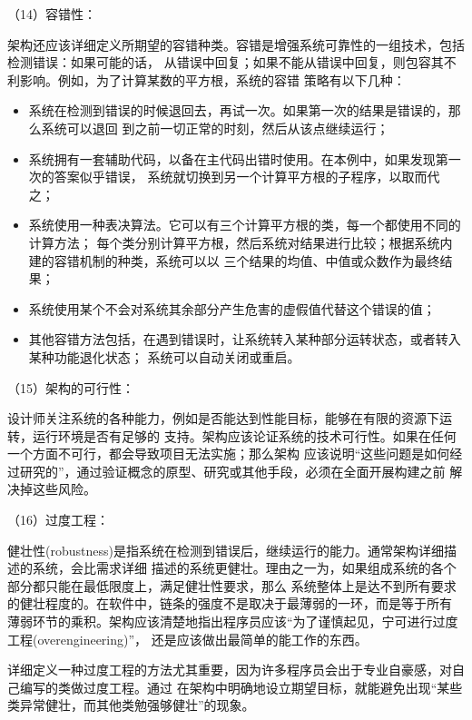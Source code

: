 \documentclass{article}
\begin{document}
\par
（14）容错性：
\par
架构还应该详细定义所期望的容错种类。容错是增强系统可靠性的一组技术，包括检测错误：如果可能的话，
从错误中回复；如果不能从错误中回复，则包容其不利影响。例如，为了计算某数的平方根，系统的容错
策略有以下几种：
\begin{itemize}
    \item 系统在检测到错误的时候退回去，再试一次。如果第一次的结果是错误的，那么系统可以退回
    到之前一切正常的时刻，然后从该点继续运行；
    \item 系统拥有一套辅助代码，以备在主代码出错时使用。在本例中，如果发现第一次的答案似乎错误，
    系统就切换到另一个计算平方根的子程序，以取而代之；
    \item 系统使用一种表决算法。它可以有三个计算平方根的类，每一个都使用不同的计算方法；
    每个类分别计算平方根，然后系统对结果进行比较；根据系统内建的容错机制的种类，系统可以以
    三个结果的均值、中值或众数作为最终结果；
    \item 系统使用某个不会对系统其余部分产生危害的虚假值代替这个错误的值；
    \item 其他容错方法包括，在遇到错误时，让系统转入某种部分运转状态，或者转入某种功能退化状态；
    系统可以自动关闭或重启。
\end{itemize}

\par
（15）架构的可行性：
\par
设计师关注系统的各种能力，例如是否能达到性能目标，能够在有限的资源下运转，运行环境是否有足够的
支持。架构应该论证系统的技术可行性。如果在任何一个方面不可行，都会导致项目无法实施；那么架构
应该说明“这些问题是如何经过研究的”，通过验证概念的原型、研究或其他手段，必须在全面开展构建之前
解决掉这些风险。

\par
（16）过度工程：
\par
健壮性(robustness)是指系统在检测到错误后，继续运行的能力。通常架构详细描述的系统，会比需求详细
描述的系统更健壮。理由之一为，如果组成系统的各个部分都只能在最低限度上，满足健壮性要求，那么
系统整体上是达不到所有要求的健壮程度的。在软件中，链条的强度不是取决于最薄弱的一环，而是等于所有
薄弱环节的乘积。架构应该清楚地指出程序员应该“为了谨慎起见，宁可进行过度工程(overengineering)”，
还是应该做出最简单的能工作的东西。
\par
详细定义一种过度工程的方法尤其重要，因为许多程序员会出于专业自豪感，对自己编写的类做过度工程。通过
在架构中明确地设立期望目标，就能避免出现“某些类异常健壮，而其他类勉强够健壮”的现象。
\end{document}
